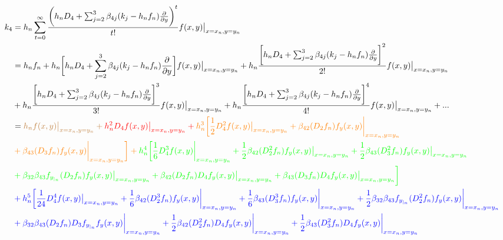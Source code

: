 \documentclass[12 pt]{article}
\begin{document}
\normalsize
\begin{equation}
	\begin{split}
		k_{4} &= h_{n}\sum_{t=0}^{\infty}\frac{\bigg(h_{n}D_{4}+\sum_{j=2}^{3}\beta_{4j}(k_{j}-h_{n}f_{n})\frac{\partial}{\partial y}\bigg)^{t}}{t!}f(x,y)\big\vert_{x = x_{n}, y= y_{n}}\\
		&= h_{n}f_{n} + h_{n}\bigg[h_{n}D_{4} + \sum_{j=2}^{3}\beta_{4j}(k_{j} - h_{n}f_{n})\frac{\partial}{\partial y}\bigg]f(x,y)\big\vert_{x = x_{n}, y= y_{n}} + h_{n}\frac{\bigg[h_{n}D_{4} + \sum_{j=2}^{3}\beta_{4j}(k_{j} - h_{n}f_{n})\frac{\partial}{\partial y}\bigg]^{2}}{2!}f(x,y)\big\vert_{x = x_{n}, y= y_{n}}\\
		&+  h_{n}\frac{\bigg[h_{n}D_{4} + \sum_{j=2}^{3}\beta_{4j}(k_{j} - h_{n}f_{n})\frac{\partial}{\partial y}\bigg]^{3}}{3!}f(x,y)\big\vert_{x = x_{n}, y= y_{n}} +  h_{n}\frac{\bigg[h_{n}D_{4} + \sum_{j=2}^{3}\beta_{4j}(k_{j} - h_{n}f_{n})\frac{\partial}{\partial y}\bigg]^{4}}{4!}f(x,y)\big\vert_{x = x_{n}, y= y_{n}} + ...\\
		&= \color{brown}h_{n}f(x,y)\big\vert_{x = x_{n}, y= y_{n}} + \color{red}h_{n}^{2}D_{4}f(x,y)\big\vert_{x = x_{n}, y= y_{n}} + \color{orange}h_{n}^{3}\bigg[\frac{1}{2}D_{4}^{2}f(x,y)\big\vert_{x = x_{n}, y= y_{n}} + \beta_{42}(D_{2}f_{n})f_{y}(x,y)\bigg\vert_{x=x_{n}, y= y_{n}} \\
		&\color{orange}+ \beta_{43}(D_{3}f_{n})f_{y}(x,y)\bigg\vert_{x=x_{n}, y= y_{n}}\bigg] + \color{green}h_{n}^{4}\bigg[\frac{1}{6}D_{4}^{3}f(x,y)\bigg\vert_{x=x_{n}, y= y_{n}} + \frac{1}{2}\beta_{42}(D_{2}^{2}f_{n})f_{y}(x,y)\big\vert_{x = x_{n}, y= y_{n}} + \frac{1}{2}\beta_{43}(D_{3}^{2}f_{n})f_{y}(x,y)\big\vert_{x = x_{n}, y= y_{n}}\\
		&\color{green}+ \beta_{32}\beta_{43}f_{y_{|_{n}}}(D_{2}f_{n})f_{y}(x,y)\big\vert_{x = x_{n}, y= y_{n}} + \beta_{42}(D_{2}f_{n})D_{4}f_{y}(x,y)\big\vert_{x = x_{n}, y= y_{n}} + \beta_{43}(D_{3}f_{n})D_{4}f_{y}(x,y)\big\vert_{x = x_{n}, y= y_{n}}\bigg]\\
		&\color{blue}+h_{n}^{5}\bigg[\frac{1}{24}D_{4}^{4}f(x,y)\big\vert_{x = x_{n}, y= y_{n}} + \frac{1}{6}\beta_{42}(D_{2}^{3}f_{n})f_{y}(x,y)\bigg\vert_{x=x_{n}, y= y_{n}} +\frac{1}{6}\beta_{43}(D_{3}^{3}f_{n})f_{y}(x,y)\bigg\vert_{x=x_{n}, y= y_{n}} + \frac{1}{2}\beta_{32}\beta_{43}f_{y_{|_{n}}}(D_{2}^{2}f_{n})f_{y}(x,y)\bigg\vert_{x=x_{n}, y= y_{n}}\\
		&\color{blue}+ \beta_{32}\beta_{43}(D_{2}f_{n})D_{3}f_{y_{|_{n}}}f_{y}(x,y)\bigg\vert_{x=x_{n}, y= y_{n}} + \frac{1}{2}\beta_{42}(D_{2}^{2}f_{n})D_{4}f_{y}(x,y)\bigg\vert_{x=x_{n}, y= y_{n}} + \frac{1}{2}\beta_{43}(D_{3}^{2}f_{n})D_{4}f_{y}(x,y)\bigg\vert_{x=x_{n}, y= y_{n}} \\

\end{split}
\end{equation}
\end{document}
